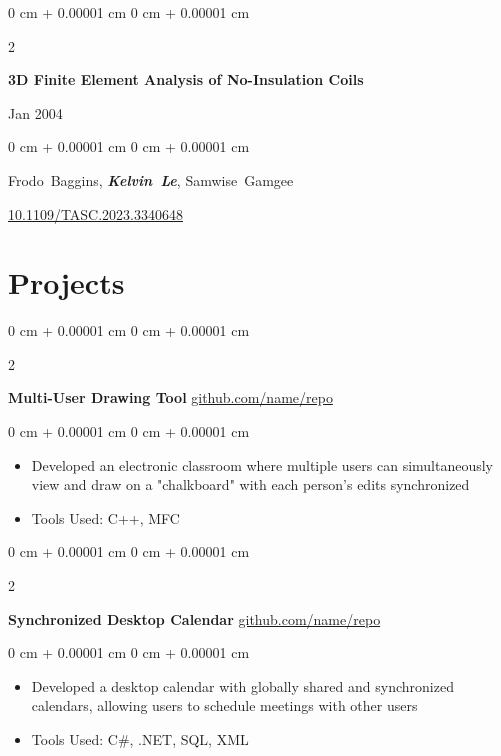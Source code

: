 \documentclass[10pt, letterpaper]{article}
\newenvironment{highlights}{
    \begin{itemize}[
        topsep=0.10 cm,
        parsep=0.10 cm,
        partopsep=0pt,
        itemsep=0pt,
        leftmargin=0 cm + 10pt
    ]
}{
    \end{itemize}
} %
\newenvironment{onecolentry}{
    \begin{adjustwidth}{
        0 cm + 0.00001 cm
    }{
        0 cm + 0.00001 cm
    }
}{
    \end{adjustwidth}
} %
\newenvironment{twocolentry}[2][]{
    \onecolentry
    \def\secondColumn{#2}
    \setcolumnwidth{\fill, 4.5 cm}
    \begin{paracol}{2}
}{
    \switchcolumn \raggedleft \secondColumn
    \end{paracol}
    \endonecolentry
} %
\begin{document}
\begin{samepage}
      \begin{twocolentry}{
                  Jan 2004
            }
            \textbf{3D Finite Element Analysis of No-Insulation Coils}
      \end{twocolentry}

      \vspace{0.10 cm}

      \begin{onecolentry}
            \mbox{Frodo Baggins}, \mbox{\textbf{\textit{Kelvin Le}}}, \mbox{Samwise Gamgee}

            \vspace{0.10 cm}

            \href{https://doi.org/10.1109/TASC.2023.3340648}{10.1109/TASC.2023.3340648}
      \end{onecolentry}
\end{samepage}

\section{Projects}

\begin{twocolentry}{
            \href{https://github.com/sinaatalay/rendercv}{github.com/name/repo}
      }
      \textbf{Multi-User Drawing Tool}\end{twocolentry}

\vspace{0.10 cm}
\begin{onecolentry}
      \begin{highlights}
            \item Developed an electronic classroom where multiple users can simultaneously view
            and draw on a "chalkboard" with each person's edits synchronized
            \item Tools Used: C++, MFC
      \end{highlights}
\end{onecolentry}

\vspace{0.2 cm}

\begin{twocolentry}{
            \href{https://github.com/sinaatalay/rendercv}{github.com/name/repo}
      }
      \textbf{Synchronized Desktop Calendar}\end{twocolentry}

\vspace{0.10 cm}
\begin{onecolentry}
      \begin{highlights}
            \item Developed a desktop calendar with globally shared and synchronized calendars,
            allowing users to schedule meetings with other users
            \item Tools Used: C\#, .NET, SQL, XML
      \end{highlights}
\end{onecolentry}
\end{document}
